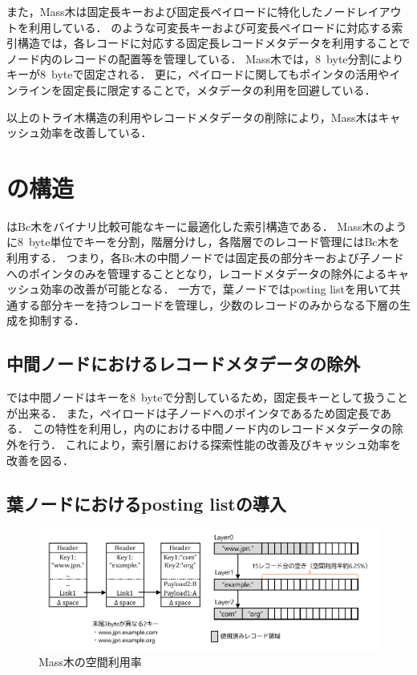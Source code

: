 また，Mass木は固定長キーおよび固定長ペイロードに特化したノードレイアウトを利用している．
\Bctree{}のような可変長キーおよび可変長ペイロードに対応する索引構造では，各レコードに対応する固定長レコードメタデータを利用することでノード内のレコードの配置等を管理している．
Mass木では，8~byte分割によりキーが8~byteで固定される．
更に，ペイロードに関してもポインタの活用やインラインを固定長に限定することで，メタデータの利用を回避している．

以上のトライ木構造の利用やレコードメタデータの削除により，Mass木はキャッシュ効率を改善している．

\section{\Bcforest{}の構造}
\label{sec:bc_forest_structure}

\Bcforest{}はBc木をバイナリ比較可能なキーに最適化した索引構造である．
Mass木のように8~byte単位でキーを分割，階層分けし，各階層でのレコード管理にはBc木を利用する．
つまり，各Bc木の中間ノードでは固定長の部分キーおよび子ノードへのポインタのみを管理することとなり，レコードメタデータの除外によるキャッシュ効率の改善が可能となる．
一方で，葉ノードではposting listを用いて共通する部分キーを持つレコードを管理し，少数のレコードのみからなる下層の生成を抑制する．

\subsection{中間ノードにおけるレコードメタデータの除外}
\Bcforest{}では中間ノードはキーを8~byteで分割しているため，固定長キーとして扱うことが出来る．
また，ペイロードは子ノードへのポインタであるため固定長である．
この特性を利用し，\Bcforest{}内の\Bctree{}における中間ノード内のレコードメタデータの除外を行う．
これにより，索引層における探索性能の改善及びキャッシュ効率を改善を図る．

\subsection{葉ノードにおけるposting listの導入}

\begin{figure}[t]
    \centering
    \includegraphics{./figures/memory.pdf}
    \caption{Mass木の空間利用率}
    \label{fig:memory}
\end{figure}

